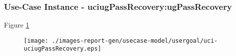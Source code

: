 
	\subsubsection{Use-Case Instance - uciugPassRecovery:ugPassRecovery}
	
	\begin{operationmodel}
	
	\end{operationmodel} 

	
	Figure \ref{fig:lu.uni.lassy.excalibur.examples.icrash-RE-UC-uci-uciugPassRecovery}
	
	\begin{figure}[htbp]
	\begin{center}
	
	\texttt{[image: ./images-report-gen/usecase-model/usergoal/uci-uciugPassRecovery.eps]}
	\end{center}
	\caption[lu.uni.lassy.excalibur.examples.icrash Sequence Diagram: uci-uciugPassRecovery]{}
	\label{fig:lu.uni.lassy.excalibur.examples.icrash-RE-UC-uci-uciugPassRecovery}
	\end{figure}
	\vspace{0.5cm}
